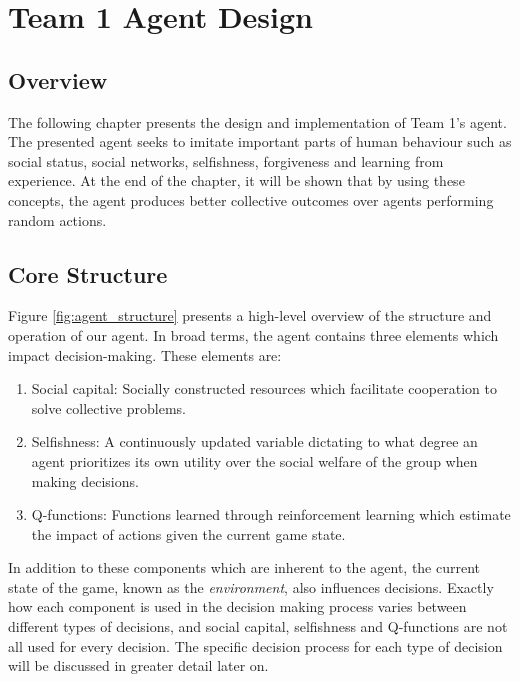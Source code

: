 \chapter{Team 1 Agent Design}\label{team_1_agent_design}

\section{Overview}

The following chapter presents the design and implementation of Team 1's agent. The presented agent seeks to imitate important parts of human behaviour such as social status, social networks, selfishness, forgiveness and learning from experience. At the end of the chapter, it will be shown that by using these concepts, the agent produces better collective outcomes over agents performing random actions.

\section{Core Structure}
Figure \ref{fig:agent_structure} presents a high-level overview of the structure and operation of our agent. In broad terms, the agent contains three elements which impact decision-making. These elements are:    
\begin{enumerate}
  \item Social capital: Socially constructed resources which facilitate cooperation to solve collective problems.
  \item Selfishness: A continuously updated variable dictating to what degree an  agent prioritizes its own utility over the social welfare of the group when making decisions. 
  \item Q-functions: Functions learned through reinforcement learning which estimate the impact of actions given the current game state.
\end{enumerate}
In addition to these components which are inherent to the agent, the current state of the game, known as the \emph{environment}, also influences decisions. Exactly how each component is used in the decision making process varies between different types of decisions, and social capital, selfishness and Q-functions are not all used for every decision. The specific decision process for each type of decision will be discussed in greater detail later on.


